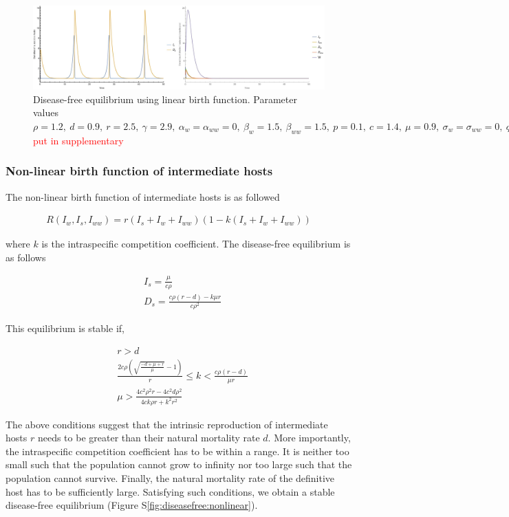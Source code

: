\documentclass{article}
\begin{document}
\begin{figure}
\includegraphics[width=\textwidth]{Figures/diseasefree_linear}
\caption{Disease-free equilibrium using linear birth function. Parameter values  $\rho = 1.2, \  d = 0.9, \  r = 2.5, \ \gamma = 2.9, \ \alpha_w =  \alpha_{ww} =  0, \ \beta_w  = 1.5, \ \beta_{ww} = 1.5, \ p = 0.1,  \ c = 1.4, \ \mu = 0.9,  \ \sigma_w = \sigma_{ww} = 0, \ q = 0.01, \  f_w = 6.5, \  f_{ww} = 7.5, \ \delta = 0.9$ \textcolor{red}{put in supplementary}} 
\label{fig:diseasefree:linear}
\end{figure}

\subsubsection{Non-linear birth function of intermediate hosts}
The non-linear birth function of intermediate hosts is as followed

\begin{align*}
R(I_w, I_s,I_{ww}) = r (I_s + I_w + I_{ww}) (1 - k (I_s + I_w + I_{ww}))
\end{align*}

where $k$ is the intraspecific competition coefficient. The disease-free equilibrium is as follows

\begin{align*}
& I_s = \frac{\mu}{c \rho } \\
& D_s = \frac{c \rho  (r-d) - k \mu  r}{c \rho ^2}
\end{align*}

This equilibrium is stable if,

\begin{align*}
& r > d \\
& \frac{2 c \rho  \left(\sqrt{\frac{-d+\mu +r}{\mu }}-1\right)}{r}\leq k < \frac{c \rho  (r-d)}{\mu  r} \\
& \mu >\frac{4 c^2 \rho ^2 r - 4 c^2 d \rho ^2}{4 c k \rho r + k^2 r^2}
\end{align*}

The above conditions suggest that the intrinsic reproduction of intermediate hosts $r$ needs to be greater than their natural mortality rate $d$. 
More importantly, the intraspecific competition coefficient has to be within a range. 
It is neither too small such that the population cannot grow to infinity nor too large such that the population cannot survive. 
Finally, the natural mortality rate of the definitive host has to be sufficiently large. Satisfying such conditions, we obtain a stable disease-free equilibrium (Figure S\ref{fig:diseasefree:nonlinear}).
\end{document}
